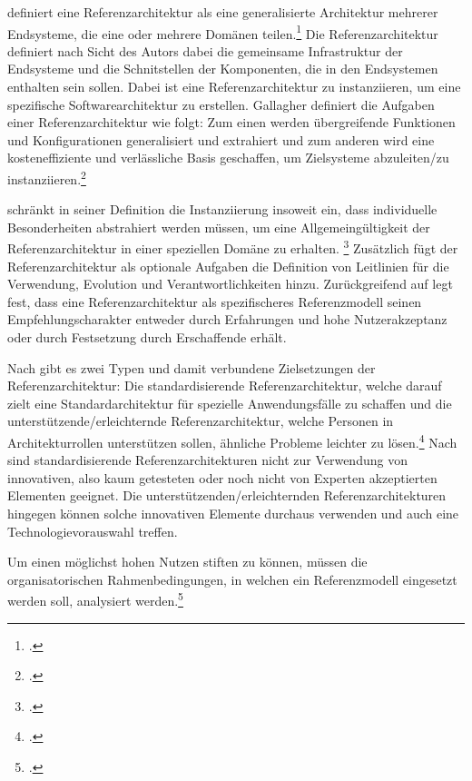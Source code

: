 \citeauthor{Gallagher.2000} definiert eine Referenzarchitektur als eine generalisierte Architektur mehrerer Endsysteme, die eine oder mehrere Domänen teilen.\footcite[Vgl. auch im Folgenden][3]{Gallagher.2000} Die Referenzarchitektur definiert nach Sicht des Autors dabei die gemeinsame Infrastruktur der Endsysteme und die Schnitstellen der Komponenten, die in den Endsystemen enthalten sein sollen. Dabei ist eine Referenzarchitektur zu instanziieren, um eine spezifische Softwarearchitektur zu erstellen. Gallagher definiert die Aufgaben einer Referenzarchitektur wie folgt: Zum einen werden übergreifende Funktionen und Konfigurationen generalisiert und extrahiert und zum anderen wird eine kosteneffiziente und verlässliche Basis geschaffen, um Zielsysteme abzuleiten/zu instanziieren.\footcite[Vgl.][3]{Gallagher.2000}

\citeauthor{Trefke.2012} schränkt in seiner Definition die Instanziierung insoweit ein, dass individuelle Besonderheiten abstrahiert werden müssen, um eine Allgemeingültigkeit der Referenzarchitektur in einer speziellen Domäne zu erhalten.  \footcite[Vgl. auch im Folgenden][]{Trefke.2012} Zusätzlich fügt \citeauthor{Trefke.2012} der Referenzarchitektur als optionale Aufgaben die Definition von Leitlinien für die Verwendung, Evolution und Verantwortlichkeiten hinzu. Zurückgreifend auf \citeauthor{vomBrocke.2003} legt \citeauthor{Trefke.2012} fest, dass eine Referenzarchitektur als spezifischeres Referenzmodell seinen Empfehlungscharakter entweder durch Erfahrungen und hohe Nutzerakzeptanz oder durch Festsetzung durch Erschaffende erhält.

Nach \citeauthor{Angelov.2012} gibt es zwei Typen und damit verbundene Zielsetzungen der Referenzarchitektur: Die standardisierende Referenzarchitektur, welche darauf zielt eine Standardarchitektur für spezielle Anwendungsfälle zu schaffen und die unterstützende/erleichternde Referenzarchitektur, welche Personen in Architekturrollen unterstützen sollen, ähnliche Probleme leichter zu lösen.\footcite[Vgl. auch im Folgenden][S.~422~ff.]{Angelov.2012} Nach \citeauthor{Angelov.2012} sind standardisierende Referenzarchitekturen nicht zur Verwendung von innovativen, also kaum getesteten oder noch nicht von Experten akzeptierten Elementen geeignet. Die unterstützenden/erleichternden Referenzarchitekturen hingegen können solche innovativen Elemente durchaus verwenden und auch eine Technologievorauswahl treffen.

Um einen möglichst hohen Nutzen stiften zu können, müssen die organisatorischen Rahmenbedingungen, in welchen ein Referenzmodell eingesetzt werden soll, analysiert werden.\footcite[Vgl.][]{vomBrocke.2004}

